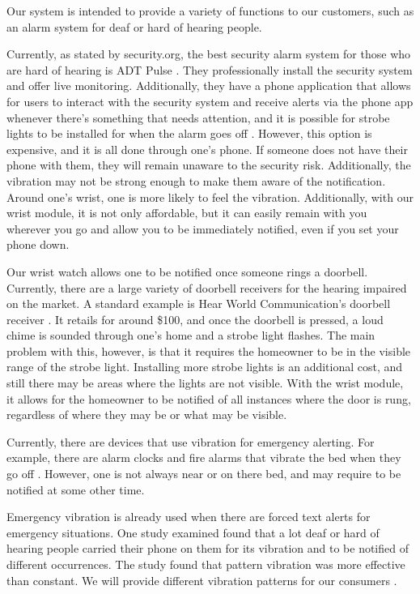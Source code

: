 Our system is intended to provide a variety of functions to our customers, such as an alarm system for deaf or hard of hearing people.

Currently, as stated by security.org, the best security alarm system for those who are hard of hearing is ADT Pulse \cite{Vigderman2021}. They professionally install the security system and offer live monitoring. Additionally, they have a phone application that allows for users to interact with the security system and receive alerts via the phone app whenever there’s something that needs attention, and it is possible for strobe lights to be installed for when the alarm goes off \cite{Zions2019}. However, this option is expensive, and it is all done through one’s phone. If someone does not have their phone with them, they will remain unaware to the security risk. Additionally, the vibration may not be strong enough to make them aware of the notification. Around one's wrist, one is more likely to feel the vibration. Additionally, with our wrist module, it is not only affordable, but it can easily remain with you wherever you go and allow you to be immediately notified, even if you set your phone down.

Our wrist watch allows one to be notified once someone rings a doorbell. Currently, there are a large variety of doorbell receivers for the hearing impaired on the market. A standard example is Hear World Communication's doorbell receiver \cite{HearWorldStrobe}. It retails for around \$100, and once the doorbell is pressed, a loud chime is sounded through one’s home and a strobe light flashes. The main problem with this, however, is that it requires the homeowner to be in the visible range of the strobe light. Installing more strobe lights is an additional cost, and still there may be areas where the lights are not visible. With the wrist module, it allows for the homeowner to be notified of all instances where the door is rung, regardless of where they may be or what may be visible.

Currently, there are devices that use vibration for emergency alerting. For example, there are alarm clocks and fire alarms that vibrate the bed when they go off \cite{WalmartAlarm} \cite{AllegroFire}. However, one is not always near or on there bed, and may require to be notified at some other time.

Emergency vibration is already used when there are forced text alerts for emergency situations. One study examined found that a lot deaf or hard of hearing people carried their phone on them for its vibration and to be notified of different occurrences. The study found that pattern vibration was more effective than constant. We will provide different vibration patterns for our consumers \cite{Harkins2010}.